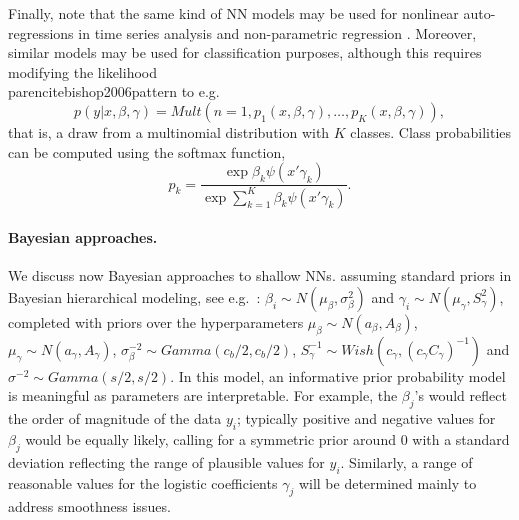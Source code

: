 Finally, note that the same kind of NN models 
may be used for nonlinear auto-regressions in
time series analysis \parencite{menchero} and 
non-parametric 
regression \parencite{insuamuller}. Moreover,
similar models may be used for classification purposes,
although this 
 requires modifying the likelihood
\\parencite{bishop2006pattern} to e.g.\
\begin{equation}
    p(y | x, \beta, \gamma) = Mult(n=1, 
    p_1 (x, \beta, \gamma) , \ldots, p_K (x, \beta, \gamma) ),
\end{equation}
that is, a draw from a multinomial distribution with $K$ classes. 
Class probabilities
 can be computed using the softmax function,
$$
p_k = \frac{\exp{\beta_k \psi(x'\gamma_k)}}{\exp{\sum_{k=1}^K \beta_k \psi(x'\gamma_k)}}.
$$


\paragraph{Bayesian approaches.}\label{bayeshallow}
We discuss now Bayesian approaches to shallow NNs.
assuming standard priors 
in Bayesian hierarchical modeling, see e.g.\ \cite{LavineWest}: 
$  \beta_i      \sim  N(\mu_\beta,\sigma_\beta^2)$
and 
  $\gamma_i     \sim  N(\mu_\gamma,S_\gamma^2)$,
  completed with priors over the hyperparameters
$\mu_\beta \sim N(a_\beta,A_\beta)$,
$\mu_\gamma \sim N(a_\gamma,A_\gamma)$,
$\sigma^{-2}_\beta \sim Gamma(c_b/2,c_b/2)$,
$S_\gamma^{-1} \sim Wish(c_\gamma,(c_\gamma C_\gamma)^{-1})$ and
$\sigma^{-2} \sim Gamma(s/2, s/2)$.
In this model, 
an informative prior probability model
is meaningful as parameters are interpretable. For example, the $\beta_ j$’s would reflect the
order of magnitude of the data $y_i$; typically positive and negative values for
$\beta _j$ would be equally likely, calling for a symmetric prior around 
0 with
a standard deviation reflecting the range of plausible values for $y_i$. Similarly,
a range of reasonable values for the logistic coefficients $\gamma_ j$ will be determined
mainly to address smoothness
issues.

